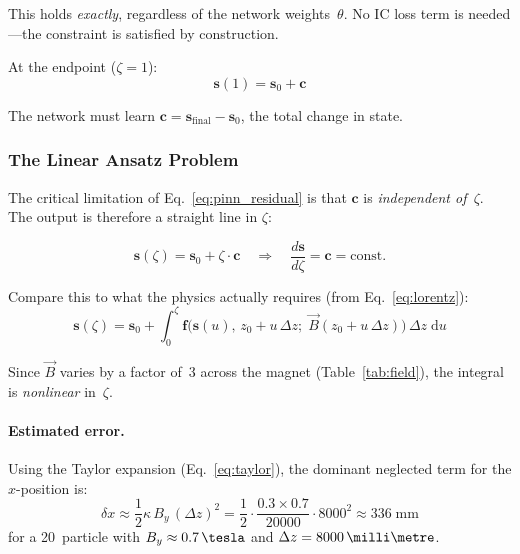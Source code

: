 \documentclass[11pt,a4paper]{article}
\newcommand{\SI}[2]{#1\,\text{#2}}
\newcommand{\zfrac}{\zeta}
\newcommand{\dz}{\Delta z}
\newcommand{\vstate}{\mathbf{s}}
\newcommand{\vc}{\mathbf{c}}
\newcommand{\vB}{\vec{B}}
\begin{document}
This holds \emph{exactly}, regardless of the network weights~$\theta$.
No IC loss term is needed---the constraint is satisfied by construction.

At the endpoint ($\zfrac=1$):
\begin{equation}\label{eq:endpoint}
  \vstate(1) = \vstate_0 + \vc
\end{equation}

The network must learn $\vc = \vstate_{\mathrm{final}} - \vstate_0$, the
total change in state.

\subsubsection{The Linear Ansatz Problem}\label{sec:linear_problem}

The critical limitation of Eq.~\eqref{eq:pinn_residual} is that $\vc$ is
\emph{independent of~$\zfrac$}.  The output is therefore a straight line in
$\zfrac$:

\begin{equation}\label{eq:linear_ansatz}
  \vstate(\zfrac) = \vstate_0 + \zfrac\cdot\vc
  \quad\Longrightarrow\quad
  \frac{d\vstate}{d\zfrac} = \vc = \text{const.}
\end{equation}

Compare this to what the physics actually requires (from
Eq.~\ref{eq:lorentz}):
\begin{equation}\label{eq:physics_requires}
  \vstate(\zfrac) = \vstate_0
  + \int_0^{\zfrac}\!\mathbf{f}\bigl(\vstate(u),\,z_0+u\,\dz;\;
  \vB(z_0+u\,\dz)\bigr)\,\dz\;\mathrm{d}u
\end{equation}

Since $\vB$ varies by a factor of~3 across the magnet
(Table~\ref{tab:field}), the integral is \emph{nonlinear} in~$\zfrac$.

\paragraph{Estimated error.}
Using the Taylor expansion (Eq.~\ref{eq:taylor}), the dominant neglected
term for the $x$-position is:
\begin{equation}\label{eq:linear_error}
  \delta x \approx \frac{1}{2}\kappa\,B_y\,(\dz)^2
  = \frac{1}{2}\cdot\frac{0.3\times0.7}{20000}\cdot8000^2
  \approx 336\;\text{mm}
\end{equation}
for a \SI{20}{\giga\electronvolt} particle with $B_y\approx\SI{0.7}{\tesla}$
and $\dz=\SI{8000}{\milli\metre}$.
\end{document}
